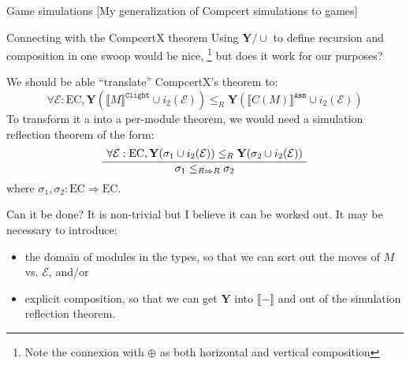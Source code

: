 \documentclass[handout]{beamer}
\newcommand{\EC}{\text{EC}}
\newcommand{\ECEC}{\EC \Rightarrow \EC}
\newcommand{\kw}[1]{\texttt{#1}}
\newcommand{\Y}{\mathbf{Y}}
\newcommand{\E}{\mathcal{E}}
\begin{document}
\begin{frame}{Game simulations} %
[My generalization of Compcert simulations to games]
\end{frame}

\begin{frame}{Connecting with the CompcertX theorem} %
Using $\Y/\cup$ to define recursion and composition in one swoop would be nice,%
\footnote{Note the connexion with $\oplus$ as both horizontal and vertical composition}
but does it work for our purposes?

We should be able ``translate'' CompcertX's theorem to:
\[
	\forall \E : \EC,
		\Y (\llbracket M \rrbracket^\kw{Clight} \cup i_2(\E)) \le_R
		\Y (\llbracket C(M) \rrbracket^\kw{Asm} \cup i_2(\E))
\]
To transform it a into a per-module theorem,
we would need a simulation reflection theorem of the form:
\[
	\AxiomC{$\forall \E : \EC, \Y (\sigma_1 \cup i_2(\E)) \le_R \Y (\sigma_2 \cup i_2(\E))$}
	\UnaryInfC{$\sigma_1 \le_{R \Rightarrow R} \sigma_2$}
	\DisplayProof
\]
where $\sigma_1, \sigma_2 : \ECEC$.
\end{frame}

\begin{frame}{Can it be done?} %
It is non-trivial but I believe it can be worked out.
It may be necessary to introduce:
\begin{itemize}
\item the domain of modules in the types,
	so that we can sort out the moves of $M$ vs. $\E$, and/or
\item explicit composition,
	so that we can get $\Y$ into $\llbracket - \rrbracket$ and
	out of the simulation reflection theorem.
\end{itemize}
\end{frame}
\end{document}
